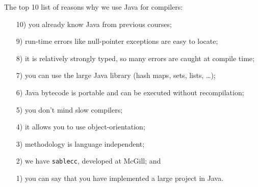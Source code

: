 \begin{slide*}
The top 10 list of reasons why we use Java for compilers:\\

\begin{small}
\begin{itemize}
\item[10)] you already know Java from previous courses;
\item[9)] run-time errors like null-pointer exceptions are easy to locate;
\item[8)] it is relatively strongly typed, so many errors are caught at compile
time;
\item[7)] you can use the large Java library (hash maps, sets, lists, \ldots);
\item[6)] Java bytecode is portable and can be executed without recompilation;
\item[5)] you don't mind slow compilers;
\item[4)] it allows you to use object-orientation;
\item[3)] methodology is language independent;
\item[2)] we have {\tt sablecc}, developed at McGill; and
\item[1)] you can say that you have implemented a large project in Java.
\end{itemize}
\vfil
\end{small}
\end{slide*}

